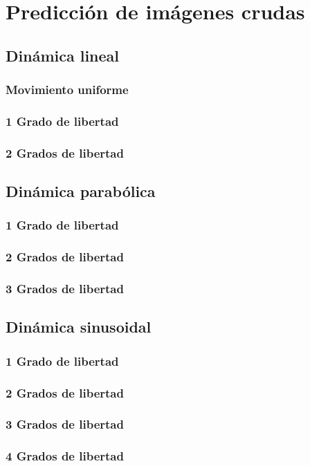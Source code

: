 \chapter{Predicción de imágenes crudas}\label{cap.redes3dcrud}

\section{Dinámica lineal}
\subsection{Movimiento uniforme}
\subsection{1 Grado de libertad}
\subsection{2 Grados de libertad}

\section{Dinámica parabólica}
\subsection{1 Grado de libertad}
\subsection{2 Grados de libertad}
\subsection{3 Grados de libertad}

\section{Dinámica sinusoidal}
\subsection{1 Grado de libertad}
\subsection{2 Grados de libertad}
\subsection{3 Grados de libertad}
\subsection{4 Grados de libertad}